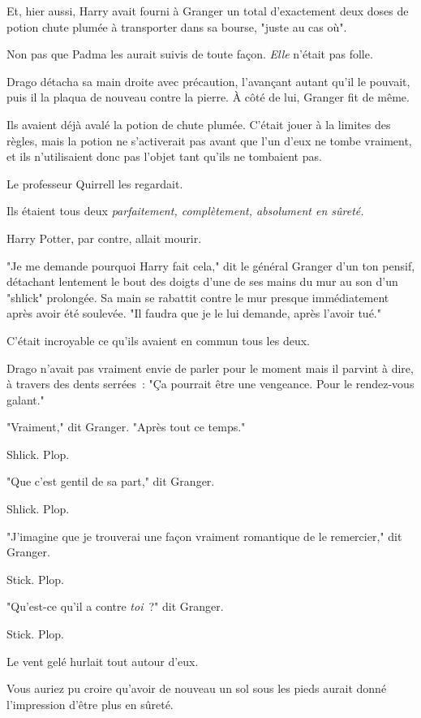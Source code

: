 Et, hier aussi, Harry avait fourni à Granger un total d'exactement deux doses de potion chute plumée à transporter dans sa bourse, "juste au cas où".

Non pas que Padma les aurait suivis de toute façon. \emph{Elle} n'était pas folle.

Drago détacha sa main droite avec précaution, l'avançant autant qu'il le pouvait, puis il la plaqua de nouveau contre la pierre. À côté de lui, Granger fit de même.

Ils avaient déjà avalé la potion de chute plumée. C'était jouer à la limites des règles, mais la potion ne s'activerait pas avant que l'un d'eux ne tombe vraiment, et ils n'utilisaient donc pas l'objet tant qu'ils ne tombaient pas.

Le professeur Quirrell les regardait.

Ils étaient tous deux \emph{parfaitement, complètement, absolument en sûreté.}

Harry Potter, par contre, allait mourir.

"Je me demande pourquoi Harry fait cela," dit le général Granger d'un ton pensif, détachant lentement le bout des doigts d'une de ses mains du mur au son d'un "shlick" prolongée. Sa main se rabattit contre le mur presque immédiatement après avoir été soulevée. "Il faudra que je le lui demande, après l'avoir tué."

C'était incroyable ce qu'ils avaient en commun tous les deux.

Drago n'avait pas vraiment envie de parler pour le moment mais il parvint à dire, à travers des dents serrées~: "Ça pourrait être une vengeance. Pour le rendez-vous galant."

"Vraiment," dit Granger. "Après tout ce temps."

Shlick. Plop.

"Que c'est gentil de sa part," dit Granger.

Shlick. Plop.

"J'imagine que je trouverai une façon vraiment romantique de le remercier," dit Granger.

Stick. Plop.

"Qu'est-ce qu'il a contre \emph{toi}~?" dit Granger.

Stick. Plop.

Le vent gelé hurlait tout autour d'eux.

\later

Vous auriez pu croire qu'avoir de nouveau un sol sous les pieds aurait donné l'impression d'être plus en sûreté.

